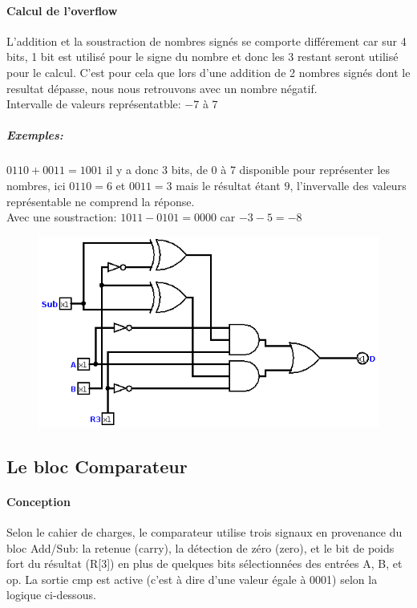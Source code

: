\documentclass[a4paper]{article}
\begin{document}
\begin{tcolorbox}[colframe=Monokaimagenta,colback=white]

\paragraph{Calcul de l'overflow}
    L'addition et la soustraction de nombres signés se comporte différement car sur 4 bits, 1 bit est utilisé pour le signe du nombre et donc les 3 restant seront utilisé pour le calcul. C'est pour cela que lors d'une addition de 2 nombres signés dont le resultat dépasse, nous nous retrouvons avec un nombre négatif.\\
    Intervalle de valeurs représentatble: $-7$ à $7$
    \subparagraph{Exemples:} $0110 + 0011 = 1001$ il y a donc 3 bits, de 0 à 7  disponible pour représenter les nombres, ici $0110 = 6$ et $0011 = 3$ mais le résultat étant $9$, l'invervalle des valeurs représentable ne comprend la réponse.\\
    Avec une soustraction: $1011 - 0101  = 0000$ car $-3 - 5 = -8$
    
\begin{figure}[H]
    \centering
    \includegraphics[width=\textwidth]{src/OVERFADDSUB_4BITS}
    \label{fig:OVERFADDSUB_4BITS}
\end{figure}

\end{tcolorbox}

\subsection{Le bloc Comparateur}
\label{comp}
\paragraph{Conception} Selon le cahier de charges, le comparateur utilise trois signaux en provenance du bloc Add/Sub: la retenue (carry), la détection de zéro (zero), et le bit de poids fort du résultat (R[3]) en plus de quelques bits sélectionnées des entrées A, B, et op. La sortie cmp est active (c’est à dire d’une valeur égale à 0001) selon la logique ci-dessous.
\end{document}
